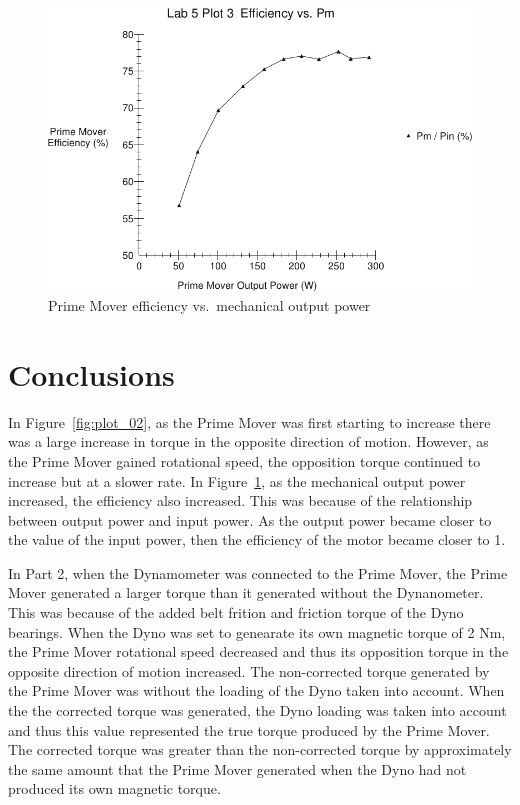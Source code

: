\documentclass{article}
\begin{document}
\begin{figure}[H]
  \centering
  \includegraphics[width=\textwidth]{img/plot3}
  \caption{Prime Mover efficiency vs.\ mechanical output power}
  \label{fig:plot_03}
\end{figure}

\section{Conclusions} In Figure~\ref{fig:plot_02}, as the Prime Mover was first
starting to increase there was a large increase in torque in the opposite
direction of motion. However, as the Prime Mover gained rotational speed, the
opposition torque continued to increase but at a slower rate. In
Figure~\ref{fig:plot_03}, as the mechanical output power increased, the
efficiency also increased. This was because of the relationship between output
power and input power. As the output power became closer to the value of the
input power, then the efficiency of the motor became closer to 1.

In Part 2, when the Dynamometer was connected to the Prime Mover, the Prime
Mover generated a larger torque than it generated without the Dynanometer. This
was because of the added belt frition and friction torque of the Dyno bearings.
When the Dyno was set to genearate its own magnetic torque of 2 Nm, the Prime
Mover rotational speed decreased and thus its opposition torque in the opposite
direction of motion increased. The non-corrected torque generated by the Prime
Mover was without the loading of the Dyno taken into account. When the the
corrected torque was generated, the Dyno loading was taken into account and
thus this value represented the true torque produced by the Prime Mover. The
corrected torque was greater than the non-corrected torque by approximately the
same amount that the Prime Mover generated when the Dyno had not produced its
own magnetic torque.
\end{document}
